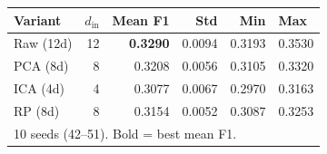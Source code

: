 \begin{tabular}{lrrrrl}
\toprule
Variant & $d_{\mathrm{in}}$ & Mean F1 & Std & Min & Max \\
\midrule
Raw (12d) & 12 & \textbf{0.3290} & 0.0094 & 0.3193 & 0.3530 \\
PCA (8d) & 8 & 0.3208 & 0.0056 & 0.3105 & 0.3320 \\
ICA (4d) & 4 & 0.3077 & 0.0067 & 0.2970 & 0.3163 \\
RP (8d) & 8 & 0.3154 & 0.0052 & 0.3087 & 0.3253 \\
\multicolumn{6}{l}{\footnotesize 10 seeds (42--51). Bold = best mean F1.} \\
\bottomrule
\end{tabular}
